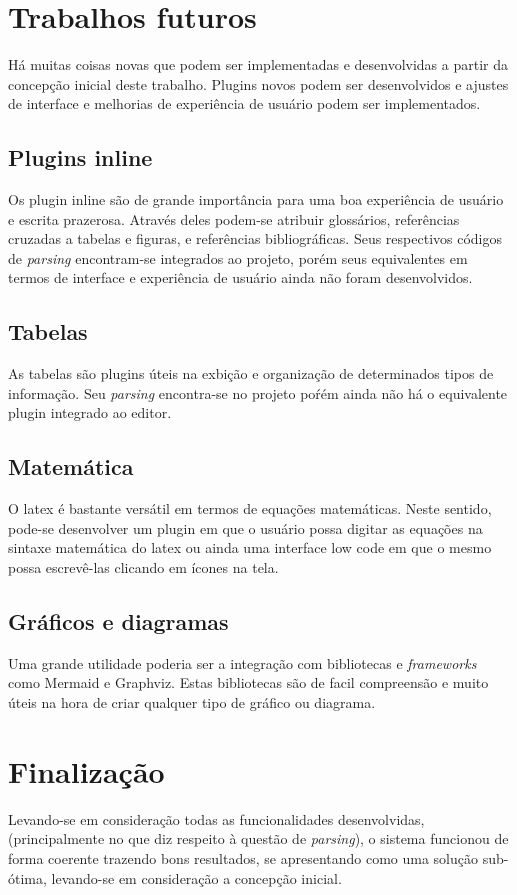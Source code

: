 \section{Trabalhos futuros}

Há muitas coisas novas que podem ser implementadas e desenvolvidas a partir da concepção inicial deste trabalho.
Plugins novos podem ser desenvolvidos e ajustes de interface e melhorias de experiência de usuário podem
ser implementados.

\subsection{Plugins inline}

Os plugin inline são de grande importância para uma boa experiência de usuário
e escrita prazerosa. Através deles podem-se atribuir glossários, referências cruzadas
a tabelas e figuras, e referências bibliográficas. Seus respectivos códigos de \textit{parsing}
encontram-se integrados ao projeto, porém seus equivalentes em termos de interface
e experiência de usuário ainda não foram desenvolvidos.

\subsection{Tabelas}

As tabelas são plugins úteis na exbição e organização de determinados tipos de informação.
Seu \textit{parsing} encontra-se no projeto poŕém ainda não há o equivalente plugin integrado ao editor.

\subsection{Matemática}

O
\acrshort{latex}
é bastante versátil em termos de equações matemáticas. Neste sentido, pode-se
desenvolver um plugin em que o usuário possa digitar as equações na sintaxe
matemática do
\acrshort{latex}
ou ainda uma interface low code em que o mesmo possa
escrevê-las clicando em ícones na tela.

\subsection{Gráficos e diagramas}

Uma grande utilidade poderia ser a integração com bibliotecas e \textit{frameworks}
como Mermaid e Graphviz. Estas bibliotecas são de facil compreensão e muito
úteis na hora de criar qualquer tipo de gráfico ou diagrama.

\section{Finalização}

Levando-se em consideração todas as funcionalidades desenvolvidas, (principalmente no que diz
respeito à questão de \textit{parsing}), o sistema funcionou de forma coerente trazendo bons resultados,
se apresentando como uma solução sub-ótima, levando-se em consideração a concepção inicial.